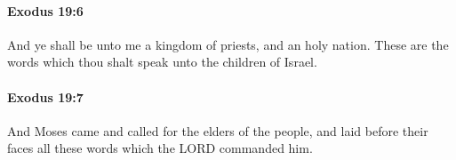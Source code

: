 		\paragraph{Exodus 19:6} %
			\label{EXODUS-19-6}

			And ye shall be unto me a kingdom of priests, and an holy nation. These are the words which thou shalt speak unto the children of Israel.


		\paragraph{Exodus 19:7} %
			\label{EXODUS-19-7}

			And Moses came and called for the elders of the people, and laid before their faces all these words which the LORD commanded him.


